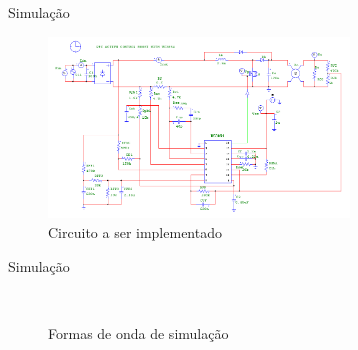 \documentclass{beamer}
\begin{document}
\begin{frame}{Simulação}
	
	\begin{figure}[htb]
		\centering
		\includegraphics[width=8cm]{../../ESQUEMAS/PFC_BOOST.png}
		\caption{Circuito a ser implementado}
	\end{figure}
	
\end{frame}
\begin{frame}{Simulação}
	
\begin{figure}[htb]
	\centering
	\mbox{
		\qquad
	}
	\caption{Formas de onda de simulação}
\end{figure}
	
\end{frame}
\end{document}
